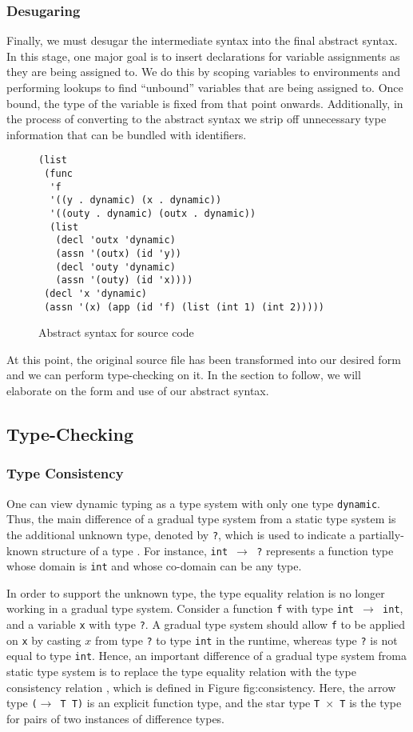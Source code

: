 \subsubsection{Desugaring}
Finally, we must desugar the intermediate syntax into the final abstract syntax. In this stage, one major goal is to insert declarations for variable assignments as they are being assigned to. We do this by scoping variables to environments and performing lookups to find ``unbound'' variables that are being assigned to. Once bound, the type of the variable is fixed from that point onwards. Additionally, in the process of converting to the abstract syntax we strip off unnecessary type information that can be bundled with identifiers.

\begin{figure}[h]
    \begin{lstlisting}[language=racket]
(list
 (func
  'f
  '((y . dynamic) (x . dynamic))
  '((outy . dynamic) (outx . dynamic))
  (list
   (decl 'outx 'dynamic)
   (assn '(outx) (id 'y))
   (decl 'outy 'dynamic)
   (assn '(outy) (id 'x))))
 (decl 'x 'dynamic)
 (assn '(x) (app (id 'f) (list (int 1) (int 2)))))
    \end{lstlisting}
    \caption[]{Abstract syntax for source code}
    \label{fig:ast}
\end{figure}

At this point, the original source file has been transformed into our desired form and we can perform type-checking on it. In the section to follow, we will elaborate on the form and use of our abstract syntax.

\subsection{Type-Checking}

\subsubsection{Type Consistency}
\label{sec:consistency}
One can view dynamic typing as a type system with only one type {\tt dynamic}. Thus, the main difference of a gradual type system from a static type system is the additional unknown type, denoted by {\tt ?}, which is used to indicate a partially-known structure of a type \cite{siek2006gradual}. For instance, {\tt int $\to$ ?} represents a function type whose domain is {\tt int} and whose co-domain can be any type.

In order to support the unknown type, the type equality relation is no longer working in a gradual type system. Consider a function {\tt f} with type {\tt int $\to$ int}, and a variable {\tt x} with type {\tt ?}. A gradual type system should allow {\tt f} to be applied on {\tt x} by casting $x$ from type {\tt ?} to type {\tt int} in the runtime, whereas type {\tt ?} is not equal to type {\tt int}. Hence, an important difference of a gradual type system froma static type system is to replace the type equality relation with the type consistency relation \cite{siek2006gradual}, which is defined in Figure {fig:consistency}. Here, the arrow type {\tt ($\rightarrow$ T T)} is an explicit function type, and the star type {\tt T $\times$ T} is the type for pairs of two instances of difference types.

